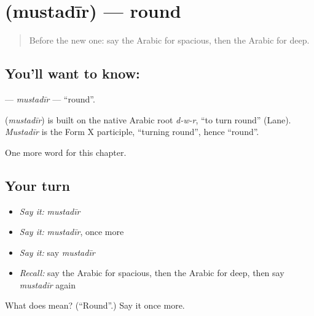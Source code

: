 \section[\texorpdfstring{\ar{مستدير} (mustadīr)}{مستدير (mustadīr)}]{ (mustadīr) — round}

\label{lesson:AR-C148-mustadir}



\begin{quote}
Before the new one: say the Arabic for spacious, then the Arabic for deep.
\end{quote}

\subsection*{You'll want to know: }
\textbf{} — \emph{mustadīr} — \textquotedblleft{}round\textquotedblright{}.

\begin{cousinweb}
\textbf{} (\emph{mustadīr}) is built on the native Arabic root \emph{d-w-r}, \textquotedblleft{}to turn round\textquotedblright{} (Lane). \emph{Mustadīr} is the Form X participle, \textquotedblleft{}turning round\textquotedblright{}, hence \textquotedblleft{}round\textquotedblright{}.
\end{cousinweb}

\begin{grammarlens}[title={What you've built}]
One more word for this chapter.
\end{grammarlens}

\subsection*{Your turn}
\begin{itemize}
\raggedright
  \item \emph{Say it:} \emph{mustadīr}
  \item \emph{Say it:} \emph{mustadīr}, once more
  \item \emph{Say it:} say \emph{mustadīr}
  \item \emph{Recall:} say the Arabic for spacious, then the Arabic for deep, then say \emph{mustadīr} again
\end{itemize}

\begin{tcolorbox}[breakable,colback=teal!4,colframe=teal!35!black,title={Before you move on}]
What does  mean? (\textquotedblleft{}Round\textquotedblright{}.) Say it once more.
\end{tcolorbox}
